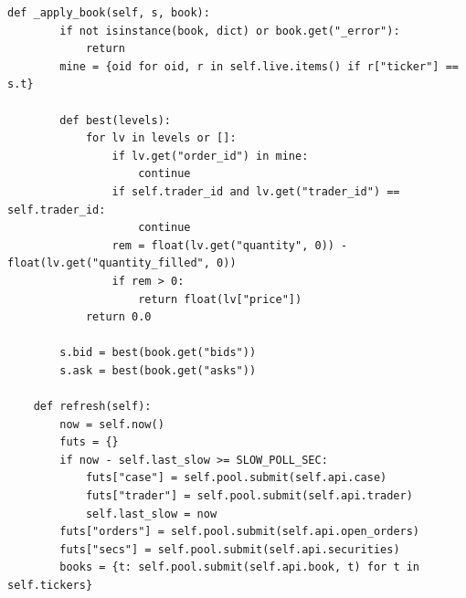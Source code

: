 \begin{lstlisting}[style=algocode]
    def _apply_book(self, s, book):
        if not isinstance(book, dict) or book.get("_error"):
            return
        mine = {oid for oid, r in self.live.items() if r["ticker"] == s.t}

        def best(levels):
            for lv in levels or []:
                if lv.get("order_id") in mine:
                    continue
                if self.trader_id and lv.get("trader_id") == self.trader_id:
                    continue
                rem = float(lv.get("quantity", 0)) - float(lv.get("quantity_filled", 0))
                if rem > 0:
                    return float(lv["price"])
            return 0.0

        s.bid = best(book.get("bids"))
        s.ask = best(book.get("asks"))

    def refresh(self):
        now = self.now()
        futs = {}
        if now - self.last_slow >= SLOW_POLL_SEC:
            futs["case"] = self.pool.submit(self.api.case)
            futs["trader"] = self.pool.submit(self.api.trader)
            self.last_slow = now
        futs["orders"] = self.pool.submit(self.api.open_orders)
        futs["secs"] = self.pool.submit(self.api.securities)
        books = {t: self.pool.submit(self.api.book, t) for t in self.tickers}


\end{lstlisting}
